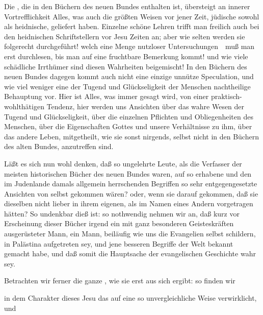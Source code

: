 \begin{aufza}
\item Die , die in den Büchern des neuen Bundes enthalten ist, übersteigt an innerer Vortrefflichkeit Alles, was auch die größten Weisen vor jener Zeit, jüdische sowohl als heidnische, geliefert haben. Einzelne schöne Lehren trifft man freilich auch bei den heidnischen Schriftstellern vor Jesu Zeiten an; aber wie selten werden sie folgerecht durchgeführt! welch eine Menge nutzloser Untersuchungen~\ muß man erst durchlesen, bis man auf eine fruchtbare Bemerkung kommt! und wie viele schädliche Irrthümer sind diesen Wahrheiten beigemischt! In den Büchern des neuen Bundes dagegen kommt auch nicht eine einzige unnütze Speculation, und wie viel weniger eine der Tugend und Glückseligkeit der Menschen nachtheilige Behauptung vor. Hier ist Alles, was immer gesagt wird, von einer praktisch-wohlthätigen Tendenz, hier werden uns Ansichten über das wahre Wesen der Tugend und Glückseligkeit, über die einzelnen Pflichten und Obliegenheiten des Menschen, über die Eigenschaften Gottes und unsere Verhältnisse zu ihm, über das andere Leben, mitgetheilt, wie sie sonst nirgends, selbst nicht in den Büchern des alten Bundes, anzutreffen sind.
\item Läßt es sich nun wohl denken, daß so ungelehrte Leute, als die Verfasser der meisten historischen Bücher des neuen Bundes waren, auf so erhabene und den im Judenlande damals allgemein herrschenden Begriffen so sehr entgegengesetzte Ansichten von selbst gekommen wären? oder, wenn sie darauf gekommen, daß sie dieselben nicht lieber in ihrem eigenen, als im Namen eines Andern vorgetragen hätten? So undenkbar dieß ist: so nothwendig nehmen wir an, daß kurz vor Erscheinung dieser Bücher irgend ein mit ganz besonderen Geisteskräften ausgerüsteter Mann, ein Mann, beiläufig wie uns die Evangelien  selbst schildern, in Palästina aufgetreten sey, und jene besseren Begriffe der Welt bekannt gemacht habe, und daß somit die Hauptsache der evangelischen Geschichte wahr sey.
\item Betrachten wir ferner die ganze , wie sie erst aus  sich ergibt: so finden wir 
\begin{aufzb}
\item in dem Charakter dieses Jesu das  auf eine so unvergleichliche Weise verwirklicht, und

\end{aufzb}
\end{aufza}
